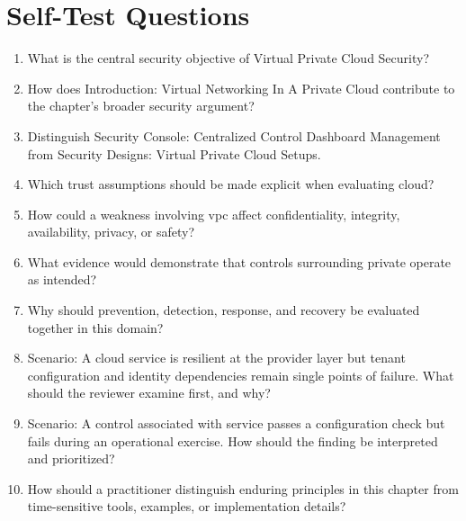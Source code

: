 \documentclass[11pt,letterpaper]{article}
\begin{document}
\section*{Self-Test Questions}
\begin{enumerate}
\item What is the central security objective of Virtual Private Cloud Security?
\item How does Introduction: Virtual Networking In A Private Cloud contribute to the chapter's broader security argument?
\item Distinguish Security Console: Centralized Control Dashboard Management from Security Designs: Virtual Private Cloud Setups.
\item Which trust assumptions should be made explicit when evaluating cloud?
\item How could a weakness involving vpc affect confidentiality, integrity, availability, privacy, or safety?
\item What evidence would demonstrate that controls surrounding private operate as intended?
\item Why should prevention, detection, response, and recovery be evaluated together in this domain?
\item Scenario: A cloud service is resilient at the provider layer but tenant configuration and identity dependencies remain single points of failure. What should the reviewer examine first, and why?
\item Scenario: A control associated with service passes a configuration check but fails during an operational exercise. How should the finding be interpreted and prioritized?
\item How should a practitioner distinguish enduring principles in this chapter from time-sensitive tools, examples, or implementation details?
\end{enumerate}
\end{document}
